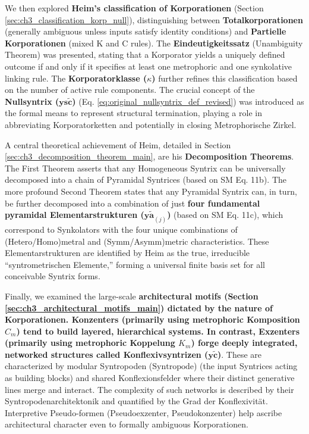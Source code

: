 \documentclass[
    12pt,              %
    a4paper,           %
    headings=normal,   %
    twoside=true,      %
    BCOR=8mm,          %
]{scrbook}
\newcommand{\q}[1]{\enquote{#1}}
\newcommand{\nullsyntrix}{\bm{ys\widetilde{c}}}
\newcommand{\elementarstruktur}{\bm{y\widetilde{a}}_{(j)}}
\newcommand{\konflexivsyntrix}{\bm{y\widetilde{c}}}
\newcommand{\syntropode}{\text{Syntropode}}
\begin{document}
We then explored \textbf{Heim's classification of Korporationen} (Section \ref{sec:ch3_classification_korp_null}), distinguishing between \textbf{Totalkorporationen} (generally ambiguous unless inputs satisfy identity conditions) and \textbf{Partielle Korporationen} (mixed K and C rules). The \textbf{Eindeutigkeitssatz} (Unambiguity Theorem) was presented, stating that a Korporator yields a uniquely defined outcome if and only if it specifies at least one metrophoric and one synkolative linking rule. The \textbf{Korporatorklasse (\(\kappa\))} further refines this classification based on the number of active rule components. The crucial concept of the \textbf{Nullsyntrix (\(\nullsyntrix\))} (Eq. \eqref{eq:original_nullsyntrix_def_revised}) was introduced as the formal means to represent structural termination, playing a role in abbreviating Korporatorketten and potentially in closing Metrophorische Zirkel.

A central theoretical achievement of Heim, detailed in Section \ref{sec:ch3_decomposition_theorem_main}, are his \textbf{Decomposition Theorems}. The First Theorem asserts that any Homogeneous Syntrix can be universally decomposed into a chain of Pyramidal Syntrices (based on SM Eq. 11b). The more profound Second Theorem states that any Pyramidal Syntrix can, in turn, be further decomposed into a combination of just \textbf{four fundamental pyramidal Elementarstrukturen (\(\elementarstruktur\))} (based on SM Eq. 11c), which correspond to Synkolators with the four unique combinations of (Hetero/Homo)metral and (Symm/Asymm)metric characteristics. These Elementarstrukturen are identified by Heim as the true, irreducible \q{syntrometrischen Elemente,} forming a universal finite basis set for all conceivable Syntrix forms.

Finally, we examined the large-scale \textbf{architectural motifs (Section \ref{sec:ch3_architectural_motifs_main}) dictated by the nature of Korporationen. Konzenters (primarily using metrophoric Komposition \(C_m\)) tend to build layered, hierarchical systems. In contrast, Exzenters (primarily using metrophoric Koppelung \(K_m\)) forge deeply integrated, networked structures called Konflexivsyntrizen (\(\konflexivsyntrix\))}. These are characterized by modular Syntropoden (\(\syntropode\)) (the input Syntrices acting as building blocks) and shared Konflexionsfelder where their distinct generative lines merge and interact. The complexity of such networks is described by their Syntropodenarchitektonik and quantified by the Grad der Konflexivität. Interpretive Pseudo-formen (Pseudoexzenter, Pseudokonzenter) help ascribe architectural character even to formally ambiguous Korporationen.
\end{document}

